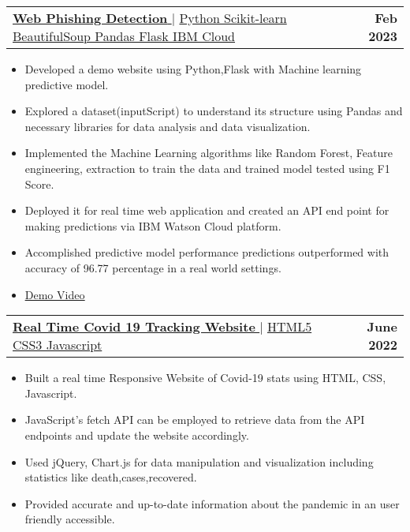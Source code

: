 \documentclass[letterpaper,11pt]{article}
\makeatletter
\newcommand{\resumeItem}[1]{
  \item\small{
    {#1 \vspace{-2pt}}
  }
}
\newcommand{\resumeProjectHeading}[2]{
    \item
    \begin{tabular*}{1.001\textwidth}{l@{\extracolsep{\fill}}r}
      \small#1 & \textbf{\small #2}\\
    \end{tabular*}\vspace{-7pt}
}
\newcommand{\resumeItemListStart}{\begin{itemize}}
\newcommand{\resumeItemListEnd}{\end{itemize}\vspace{-5pt}}
\makeatother
\begin{document}
       \resumeProjectHeading
          {\href{ProjectLink.com}{\textbf{\large{\underline{Web Phishing Detection}}} \href{https://github.com/P-r-a-s-a-n-n-a/IBM-Project-42431-1660662531}{\raisebox{-0.1\height}\faExternalLink }} $|$ \large{\underline{Python Scikit-learn BeautifulSoup Pandas Flask IBM Cloud}}}{Feb 2023}
          \vspace{-10pt}
          \resumeItemListStart
            \resumeItem{\normalsize{Developed a demo website using Python,Flask with Machine learning predictive model. 
            \textbf{}}}
            \resumeItem{\normalsize{Explored a dataset(inputScript) to understand its structure using Pandas and necessary libraries for data analysis and data visualization.
            \textbf{}}}
            \resumeItem{\normalsize{Implemented the Machine Learning algorithms like Random Forest, Feature engineering, extraction to train the data and trained model tested using F1 Score.
            \textbf{}}}
            \resumeItem{\normalsize{Deployed it for real time web application and created an API end point for making predictions via IBM Watson Cloud platform.
            \textbf{}}}
            \resumeItem{\normalsize{Accomplished predictive model performance predictions outperformed with accuracy of 96.77 percentage in a real world settings.
            \textbf{}}}

            \resumeItem{\textcolor{accent} {\href{https://drive.google.com/file/d/149AHqIwRb9flSH8hNjFHoDUpJiWVzNtU/view?usp=share_link} {\underline{\normalsize{Demo Video}}}}}
          \resumeItemListEnd 
          \vspace{-13pt}
          
     
          
          \resumeProjectHeading
          {\href{ProjectLink.com}{\textbf{\large{\underline{Real Time Covid 19 Tracking Website}}} \href{https://codesandbox.io/s/covid-19-stats-r3zt3g}{\raisebox{-0.1\height}\faExternalLink }} $|$ \large{\underline{HTML5 CSS3 Javascript}}}{June 2022}
          \vspace{-10pt}
          \resumeItemListStart
            \resumeItem{\normalsize{Built a real time Responsive Website of Covid-19 stats using HTML, CSS, Javascript.  
            \textbf{}}}
            \resumeItem{\normalsize{JavaScript's fetch API can be employed to retrieve data from the API endpoints and update the website accordingly.  
            \textbf{}}}
            \resumeItem{\normalsize{Used jQuery, Chart.js for data manipulation and visualization including statistics like death,cases,recovered.  
            \textbf{}}}
            \resumeItem{\normalsize{Provided accurate and up-to-date information about the pandemic in an user friendly accessible.  
            \textbf{}}}
          \resumeItemListEnd 
          
\end{document}

